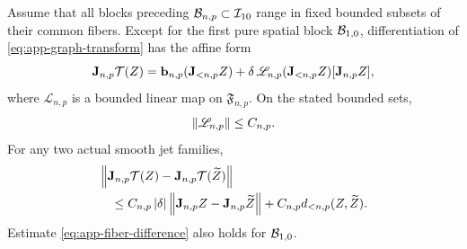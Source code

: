 \begin{lemma}
\label{lem:app-highest-block-recurrence}
Assume that all blocks preceding \(\mathcal B_{n,p}\subset\mathcal I_{10}\) range in fixed
bounded subsets of their common fibers.  Except for the first pure spatial
block \(\mathcal B_{1,0}\), differentiation of \cref{eq:app-graph-transform} has
the affine form
\begin{equation}
\label{eq:app-affine-fiber-map}
 \mathbf J_{n,p}\mathcal T(Z)
 =\mathbf b_{n,p}(\mathbf J_{<n,p}Z)
  +\delta\,\mathscr L_{n,p}(\mathbf J_{<n,p}Z)
       [\mathbf J_{n,p}Z],
\end{equation}
where \(\mathscr L_{n,p}\) is a bounded linear map on
\(\mathfrak F_{n,p}\).  On the stated bounded sets,
\begin{equation}
\label{eq:app-fiber-operator-bound}
 \left\lVert \mathscr L_{n,p}\right\rVert\leq C_{n,p}.
\end{equation}
For any two actual smooth jet families,
\begin{equation}
\label{eq:app-fiber-difference}
\begin{aligned}
 &\left\lVert \mathbf J_{n,p}\mathcal T(Z)
       -\mathbf J_{n,p}\mathcal T(\widetilde Z)\right\rVert\\
 &\quad\leq C_{n,p}\left\lvert \delta\right\rvert
       \left\lVert \mathbf J_{n,p}Z-
              \mathbf J_{n,p}\widetilde Z\right\rVert
       +C_{n,p}d_{<n,p}(Z,\widetilde Z).
\end{aligned}
\end{equation}
Estimate \cref{eq:app-fiber-difference} also holds for
\(\mathcal B_{1,0}\).
\end{lemma}

